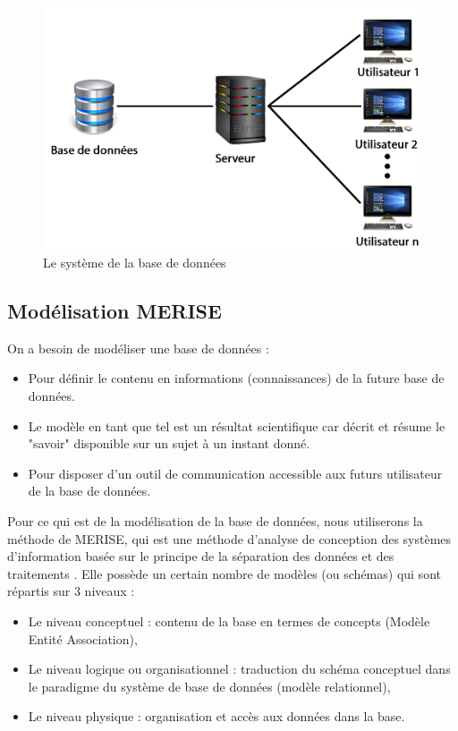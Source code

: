 \begin{figure}[h]
	\centering
	\includegraphics[width=0.8\linewidth]{Chapitre3/images/bd_system}
	\caption{Le système de la base de données}
	\label{Le système de la base de données}
\end{figure}

\subsection{Modélisation MERISE}
On a besoin de modéliser une base de données \cite{bdMenja} : 
\begin{itemize}
	\item Pour définir le contenu en informations (connaissances) de la future base de données.
	\item Le modèle en tant que tel est un résultat scientifique car décrit et résume le "savoir" disponible sur un sujet à un instant donné.
	\item Pour disposer d'un outil de communication accessible aux futurs utilisateur de la base de données.
\end{itemize}

Pour ce qui est de la modélisation de la base de données, nous utiliserons la méthode de MERISE, qui est une méthode d'analyse de conception des systèmes d'information basée sur le principe de la séparation des données et des traitements \cite{merise}. Elle possède un certain nombre de modèles (ou schémas) qui sont répartis sur 3 niveaux : 
\begin{itemize}
	\item Le niveau conceptuel : contenu de la base en termes de concepts (Modèle Entité Association), 
	\item Le niveau logique ou organisationnel : traduction du schéma conceptuel dans le paradigme du système de base de données (modèle relationnel), 
	\item Le niveau physique : organisation et accès aux données dans la base.
\end{itemize}

